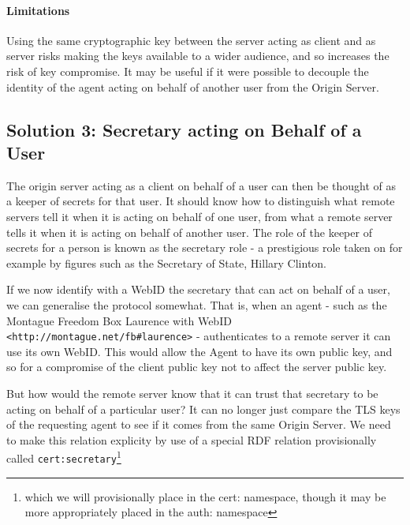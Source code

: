 \documentclass[a4paper]{llncs}
\begin{document}
\paragraph{Limitations}

Using the same cryptographic key between the server acting as client and as server risks making the keys available to a wider audience, and so increases the risk of key compromise. 
It may be useful if it were possible to decouple the identity of the agent acting on behalf of another user from the Origin Server.


\subsection{Solution 3: Secretary acting on Behalf of a User}

The origin server acting as a client on behalf of a user can then be thought of as a keeper of secrets for that user.
It should know how to distinguish what remote servers tell it when it is acting on behalf of one user, from what a remote server tells it when it is acting on behalf of another user.
The role of the keeper of secrets for a person is known as the secretary role - a prestigious role taken on for example by figures such as the Secretary of State, Hillary Clinton.

If we now identify with a WebID the secretary that can act on behalf of a user, we can generalise the protocol somewhat.
That is, when an agent - such as the Montague Freedom Box Laurence with WebID \lstinline|<http://montague.net/fb#laurence>| - authenticates to a remote server it can use its own WebID. 
This would allow the Agent to have its own public key, and so for a compromise of the client public key not to affect the server public key.

But how would the remote server know that it can trust that secretary to be acting on behalf of a particular user?
It can no longer just compare the TLS keys of the requesting agent to see if it comes from the same Origin Server.
We need to make this relation explicity by use of a special RDF relation provisionally called \lstinline|cert:secretary|\footnote{which we will provisionally place
in the cert: namespace, though it may be more appropriately placed in the auth: namespace}


\end{document}
